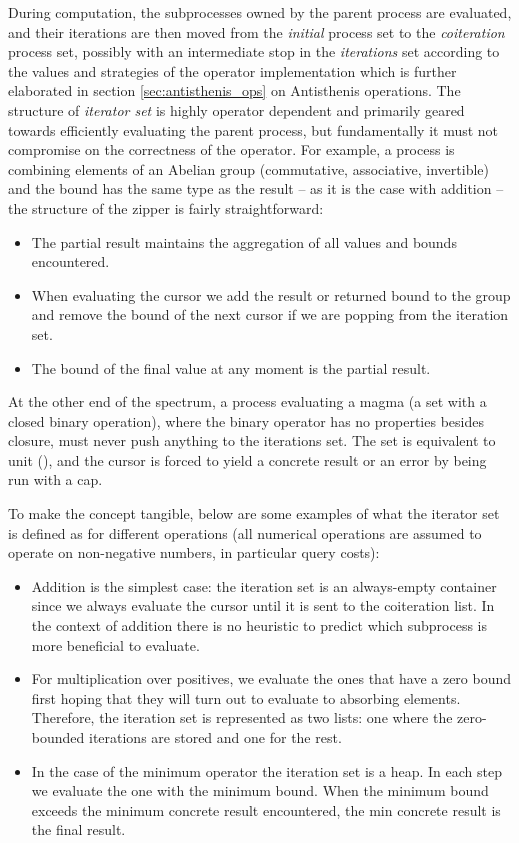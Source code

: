 During computation, the subprocesses owned by the parent process are
evaluated, and their iterations are then moved from the \emph{initial}
process set to the \emph{coiteration} process set, possibly with an
intermediate stop in the \emph{iterations} set according to the values
and strategies of the operator implementation which is further
elaborated in section \ref{sec:antisthenis_ops} on Antisthenis
operations. The structure of \emph{iterator set} is highly operator
dependent and primarily geared towards efficiently evaluating the
parent process, but fundamentally it must not compromise on the
correctness of the operator. For example, a process is combining
elements of an Abelian group (commutative, associative, invertible)
and the bound has the same type as the result -- as it is the case
with addition -- the structure of the zipper is fairly
straightforward:

\begin{itemize}
\item The partial result maintains the aggregation of all values and
  bounds encountered.
\item When evaluating the cursor we add the result or returned bound to the group and
  remove the bound of the next cursor if we are popping from the
  iteration set.
\item The bound of the final value at any moment is the partial
  result.
\end{itemize}

At the other end of the spectrum, a process evaluating a magma (a set
with a closed binary operation), where the binary operator has no
properties besides closure, must never push anything to the iterations
set. The set is equivalent to unit (\hask{()}), and the cursor is
forced to yield a concrete result or an error by being run with a
 cap.

To make the concept tangible, below are some examples of what the iterator set is
defined as for different operations (all numerical operations are
assumed to operate on non-negative numbers, in particular query
costs):

\begin{itemize}
\item Addition is the simplest case: the iteration set is an
  always-empty container since we always evaluate the cursor until it
  is sent to the coiteration list. In the context of addition there is
  no heuristic to predict which subprocess is more beneficial to
  evaluate.
\item For multiplication over positives, we evaluate the ones
  that have a zero bound first hoping that they will turn out to
  evaluate to absorbing elements. Therefore, the iteration set is
  represented as two lists: one where the zero-bounded iterations
  are stored and one for the rest.
\item In the case of the minimum operator the iteration set is a heap. In each step we
  evaluate the one with the minimum bound. When the minimum
  bound exceeds the minimum concrete result encountered, the min concrete
  result is the final result.
\end{itemize}


